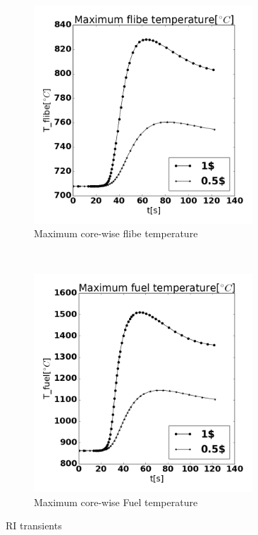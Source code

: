 \documentclass{elsarticle}
\begin{document}
\begin{figure}[ht]
\begin{subfigure}[b]{0.45\columnwidth}
        \includegraphics[width=0.9\textwidth]{./images/diffusion/RI/T_flibe_max_diff_pcm.png}
        \caption{Maximum core-wise flibe temperature}
    \end{subfigure}
    ~
    \begin{subfigure}[b]{0.45\columnwidth}
        \centering
        \includegraphics[width=0.9\textwidth]{./images/diffusion/RI/T_fuel_max_diff_pcm.png}
        \caption{Maximum core-wise Fuel temperature}
    \end{subfigure}
    \caption{RI transients}
    \label{fig:RI}
\end{figure}
\end{document}
